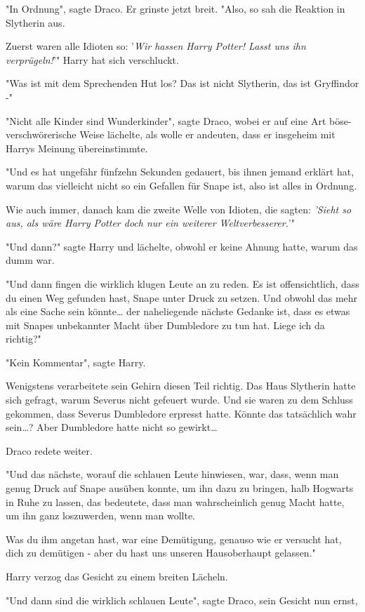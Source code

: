 {"In Ordnung", sagte Draco. Er grinste jetzt breit. "Also, so sah die Reaktion in Slytherin aus.

Zuerst waren alle Idioten so: '\emph{Wir hassen Harry Potter! Lasst uns ihn verprügeln!}'" Harry hat sich verschluckt.

"Was ist mit dem Sprechenden Hut los? Das ist nicht Slytherin, das ist Gryffindor -"

"Nicht alle Kinder sind Wunderkinder", sagte Draco, wobei er auf eine Art böse-verschwörerische Weise lächelte, als wolle er andeuten, dass er insgeheim mit Harrys Meinung übereinstimmte.

"Und es hat ungefähr fünfzehn Sekunden gedauert, bis ihnen jemand erklärt hat, warum das vielleicht nicht so ein Gefallen für Snape ist, also ist alles in Ordnung.

Wie auch immer, danach kam die zweite Welle von Idioten, die sagten: \emph{'Sieht so aus, als wäre Harry Potter doch nur ein weiterer Weltverbesserer.}'"

"Und dann?" sagte Harry und lächelte, obwohl er keine Ahnung hatte, warum das dumm war.

"Und dann fingen die wirklich klugen Leute an zu reden. Es ist offensichtlich, dass du einen Weg gefunden hast, Snape unter Druck zu setzen. Und obwohl das mehr als eine Sache sein könnte… der naheliegende nächste Gedanke ist, dass es etwas mit Snapes unbekannter Macht über Dumbledore zu tun hat. Liege ich da richtig?"

"Kein Kommentar", sagte Harry.

Wenigstens verarbeitete sein Gehirn diesen Teil richtig. Das Haus Slytherin hatte sich gefragt, warum Severus nicht gefeuert wurde. Und sie waren zu dem Schluss gekommen, dass Severus Dumbledore erpresst hatte. Könnte das tatsächlich wahr sein…? Aber Dumbledore hatte nicht so gewirkt…

Draco redete weiter.

"Und das nächste, worauf die schlauen Leute hinwiesen, war, dass, wenn man genug Druck auf Snape ausüben konnte, um ihn dazu zu bringen, halb Hogwarts in Ruhe zu lassen, das bedeutete, dass man wahrscheinlich genug Macht hatte, um ihn ganz loszuwerden, wenn man wollte.

Was du ihm angetan hast, war eine Demütigung, genauso wie er versucht hat, dich zu demütigen - aber du hast uns unseren Hausoberhaupt gelassen."

Harry verzog das Gesicht zu einem breiten Lächeln.

"Und dann sind die wirklich schlauen Leute", sagte Draco, sein Gesicht nun ernst,

}
